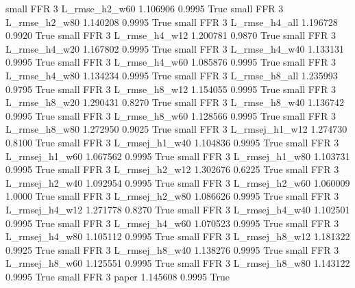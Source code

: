      small      FFR                 3  L_rmse_h2_w60   1.106906      0.9995    True
     small      FFR                 3  L_rmse_h2_w80   1.140208      0.9995    True
     small      FFR                 3  L_rmse_h4_all   1.196728      0.9920    True
     small      FFR                 3  L_rmse_h4_w12   1.200781      0.9870    True
     small      FFR                 3  L_rmse_h4_w20   1.167802      0.9995    True
     small      FFR                 3  L_rmse_h4_w40   1.133131      0.9995    True
     small      FFR                 3  L_rmse_h4_w60   1.085876      0.9995    True
     small      FFR                 3  L_rmse_h4_w80   1.134234      0.9995    True
     small      FFR                 3  L_rmse_h8_all   1.235993      0.9795    True
     small      FFR                 3  L_rmse_h8_w12   1.154055      0.9995    True
     small      FFR                 3  L_rmse_h8_w20   1.290431      0.8270    True
     small      FFR                 3  L_rmse_h8_w40   1.136742      0.9995    True
     small      FFR                 3  L_rmse_h8_w60   1.128566      0.9995    True
     small      FFR                 3  L_rmse_h8_w80   1.272950      0.9025    True
     small      FFR                 3 L_rmsej_h1_w12   1.274730      0.8100    True
     small      FFR                 3 L_rmsej_h1_w40   1.104836      0.9995    True
     small      FFR                 3 L_rmsej_h1_w60   1.067562      0.9995    True
     small      FFR                 3 L_rmsej_h1_w80   1.103731      0.9995    True
     small      FFR                 3 L_rmsej_h2_w12   1.302676      0.6225    True
     small      FFR                 3 L_rmsej_h2_w40   1.092954      0.9995    True
     small      FFR                 3 L_rmsej_h2_w60   1.060009      1.0000    True
     small      FFR                 3 L_rmsej_h2_w80   1.086626      0.9995    True
     small      FFR                 3 L_rmsej_h4_w12   1.271778      0.8270    True
     small      FFR                 3 L_rmsej_h4_w40   1.102501      0.9995    True
     small      FFR                 3 L_rmsej_h4_w60   1.070523      0.9995    True
     small      FFR                 3 L_rmsej_h4_w80   1.105112      0.9995    True
     small      FFR                 3 L_rmsej_h8_w12   1.181322      0.9925    True
     small      FFR                 3 L_rmsej_h8_w40   1.138276      0.9995    True
     small      FFR                 3 L_rmsej_h8_w60   1.125551      0.9995    True
     small      FFR                 3 L_rmsej_h8_w80   1.143122      0.9995    True
     small      FFR                 3          paper   1.145608      0.9995    True
